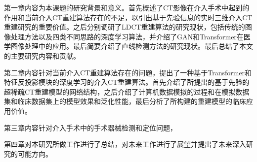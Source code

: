 第一章内容为本课题的研究背景和意义。首先概述了CT影像在介入手术中起到的作用和当前介入CT重建算法存在的不足，以引出基于先验信息的实时三维介入CT重建研究的重要价值。之后分别调研了LDCT重建算法的研究现状，包括传统的图像处理方法以及四类不同思路的深度学习算法，并介绍了GAN和Transformer在医学图像处理中的应用。最后简要介绍了直线检测方法的研究现状。最后总结了本文的主要研究内容和贡献。

第二章内容针对当前介入CT重建算法存在的问题，提出了一种基于Transformer和特征反投影模块的深度学习的介入CT重建算法。首先介绍了所提出的基于先验的超稀疏CT重建模型的网络结构，之后介绍了计算机数据模拟的过程和在模拟数据集和临床数据集上的模型效果和泛化性能，最后分析了所构建的重建模型的临床应用价值。

第三章内容针对介入手术中的手术器械检测和定位问题，

第四章对本研究所做工作进行了总结，对未来工作进行了展望并提出了未来深入研究的可能方向。
